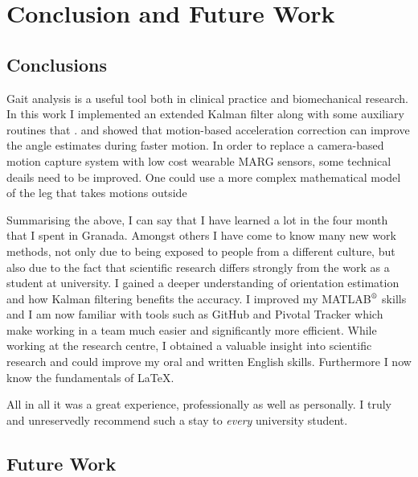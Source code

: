 \chapter{Conclusion and Future Work}
\label{ch:Conclusion and Future Work}

\section{Conclusions}

Gait analysis is a useful tool both in clinical practice and biomechanical research. In this work I implemented an extended Kalman filter along with some auxiliary routines that . and showed that motion-based acceleration correction can improve the angle estimates during faster motion. In order to replace a camera-based motion capture system with low cost wearable MARG sensors, some technical deails need to be improved. One could use a more complex mathematical model of the leg that takes motions outside 

Summarising the above, I can say that I have learned a lot in the four month that I spent in Granada. Amongst others I have come to know many new work methods, not only due to being exposed to people from a different culture, but also due to the fact that scientific research differs strongly from the work as a student at university. I gained a deeper understanding of orientation estimation and how Kalman filtering  benefits the accuracy. I improved my MATLAB$\textsuperscript{\textregistered}$ skills and I am now familiar with tools such as GitHub and Pivotal Tracker which make working in a team much easier and significantly more efficient.  While working at the research centre, I obtained a valuable insight into scientific research and could improve my oral and written English skills. Furthermore I now know the fundamentals of \LaTeX{}.

All in all it was a great experience, professionally as well as personally. I truly and unreservedly recommend such a stay to \emph{every} university student.

\section{Future Work}



